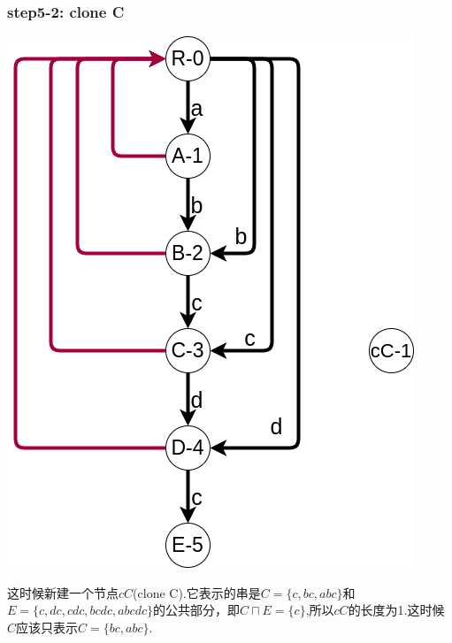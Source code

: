 \documentclass{article}
\begin{document}
\subsubsection{step5-2: clone C}
\includegraphics[scale=0.5]{step52.png} \par
这时候新建一个节点$cC$(clone C).它表示的串是$C=\{c,bc,abc\}$和$E=\{c,dc,cdc,bcdc,abcdc\}$的公共部分，即$C \sqcap E = \{c\}$,所以$cC$的长度为1.这时候$C$应该只表示$C=\{bc,abc\}$.
\end{document}
